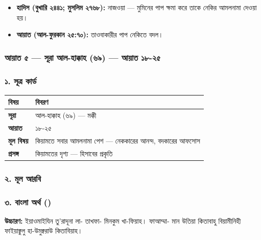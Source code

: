 \begin{itemize}
\item \textbf{হাদিস (বুখারি ২৪৪১; মুসলিম ২৭৬৮):} নাজওয়া — মুমিনের পাপ ক্ষমা করে তাকে নেকির আমলনামা দেওয়া হয়।
\item \textbf{আয়াত (আল-ফুরকান ২৫:৭০):} তাওবাকারীর পাপ নেকিতে বদল।
\end{itemize}
\subsubsection*{আয়াত ৫ — সূরা আল-হাক্কাহ (৬৯) — আয়াত ১৮-২৫}

\subsubsection*{১. সূত্র কার্ড}

\begin{table}[h]\centering\small
\begin{tabular}{ll}
বিষয় & বিবরণ \\
\hline
\textbf{সূরা} & আল-হাক্কাহ (৬৯) — মক্কী \\
\textbf{আয়াত} & ১৮-২৫ \\
\textbf{মূল বিষয়} & কিয়ামতে সবার আমলনামা পেশ — নেককারের আনন্দ, বদকারের আফসোস \\
\textbf{প্রসঙ্গ} & কিয়ামতের দৃশ্য — হিসাবের প্রকৃতি \\
\hline
\end{tabular}
\end{table}

\subsubsection*{২. মূল আরবি}

\begin{center}\end{center}

\begin{center}\end{center}

\subsubsection*{৩. বাংলা অর্থ ()}

\textbf{উচ্চারণ:} ইয়াওমাইযিন তু'রাদূনা লা- তাখফা- মিনকুম খা-ফিয়াহ। ফাআম্মা- মান উতিয়া কিতাবাহু বিয়ামীনিহী ফাইয়াক্বুলু হা-উমুক্বরাউ কিতাবিয়াহ।

